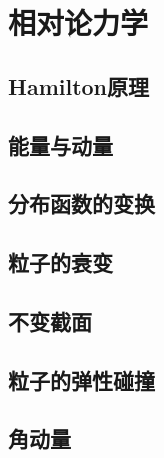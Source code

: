 \chapter{相对论力学}

\section{Hamilton原理}%

\section{能量与动量}

\section{分布函数的变换}

\section{粒子的衰变}

\section{不变截面}

\section{粒子的弹性碰撞}

\section{角动量}


